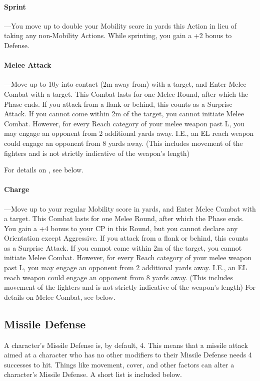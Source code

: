 \documentclass[oneside,11pt,english]{book}
\begin{document}
\paragraph{\label{par:Sprint} Sprint}---\quad You move up to double your Mobility score in yards this Action in lieu of taking any non-Mobility Actions. While sprinting, you gain a +2 bonus to Defense.

\paragraph{\label{par:Melee Attack} Melee Attack}---\quad Move up to 10y into contact (2m away from) with a target, and Enter Melee Combat with a target. This Combat lasts for one Melee Round, after which the Phase ends. If you attack from a flank or
behind, this counts as a Surprise Attack. If you cannot come within 2m of the target, you cannot initiate
Melee Combat. However, for every Reach category of your melee weapon past L, you may engage an
opponent from 2 additional yards away. I.E., an EL reach weapon could engage an opponent from 8 yards
away. (This includes movement of the fighters and is not strictly indicative of the weapon’s length)

For details on , see below.

\paragraph{\label{par:Charge} Charge}---\quad Move up to your regular Mobility score in yards, and Enter Melee Combat with a target. This
Combat lasts for one Melee Round, after which the Phase ends. You gain a +4 bonus to your CP in this
Round, but you cannot declare any Orientation except Aggressive. If you attack from a flank or
behind, this counts as a Surprise Attack. If you cannot come within 2m of the target, you cannot initiate
Melee Combat. However, for every Reach category of your melee weapon past L, you may engage an
opponent from 2 additional yards away. I.E., an EL reach weapon could engage an opponent from 8 yards
away. (This includes movement of the fighters and is not strictly indicative of the weapon’s length)
For details on Melee Combat, see below.

\subsection{Missile Defense}
A character’s Missile Defense is, by default, 4. This means that a missile attack aimed at a character who
has no other modifiers to their Missile Defense needs 4 successes to hit. Things like movement, cover,
and other factors can alter a character’s Missile Defense. A short list is included below.
\end{document}
